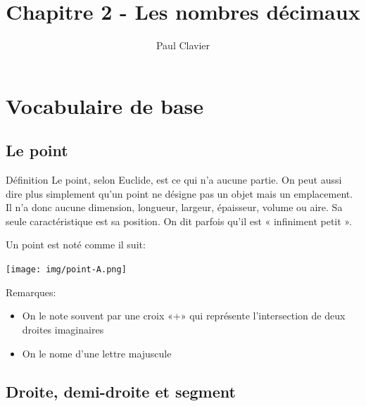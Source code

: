\documentclass[12pt,a4paper]{article}
\author{Paul Clavier}
\title{Chapitre 2 - Les nombres décimaux}
\begin{document}
\renewcommand\thesection{\Roman{section}}
\renewcommand\thesubsection{\arabic{subsection}}


\ifdefined\isprof
	\TeacherModeOn
\fi




\begin{center}
\end{center}

\section{Vocabulaire de base}

\subsection{Le point}

\begin{definition}{Définition}
Le point, selon Euclide, est ce qui n'a aucune partie. On peut aussi dire plus simplement qu'un point ne désigne pas un objet mais un emplacement. Il n'a donc aucune dimension, longueur, largeur, épaisseur, volume ou aire. Sa seule caractéristique est sa position. On dit parfois qu'il est « infiniment petit ».
\end{definition}
Un point est noté comme il suit:\\
\begin{minipage}{0.2\textwidth}
\begin{center}
\texttt{[image: img/point-A.png]}
\end{center}
\end{minipage}
\begin{minipage}{0.8\textwidth}
Remarques:
\begin{itemize}
\item On le note souvent par une croix «+» qui représente l'intersection de deux droites imaginaires
\item On le nome d'une lettre majuscule
\end{itemize}
\end{minipage}

\subsection{Droite, demi-droite et segment}
\end{document}
